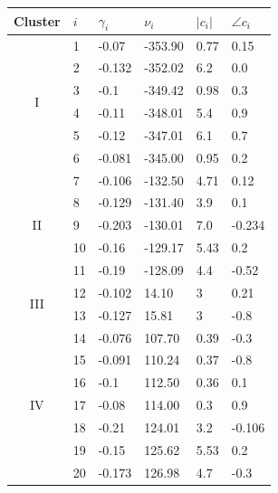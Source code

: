 \begin{table}[H]
	\centering
	\begin{tabular}{clllll}
		\multicolumn{1}{l}{Cluster} & $i$  & $\gamma_i$ & $\nu_i$      & $|c_i|$   & $\angle c_i$ \\ 
		\hline
		\multirow{6}{*}{I}            
		& 1  & -0.07      & -353.90  & 0.77   & 0.15         \\ %
		& 2  & -0.132     & -352.02  & 6.2    & 0.0          \\ %
		& 3  & -0.1       & -349.42  & 0.98   & 0.3          \\ %
		& 4  & -0.11      & -348.01  & 5.4    & 0.9          \\ %
		& 5  & -0.12      & -347.01  & 6.1    & 0.7          \\ %
		& 6  & -0.081     & -345.00  & 0.95   & 0.2          \\ 
		\hline
		\multirow{5}{*}{II}          
		& 7  & -0.106     & -132.50  & 4.71   & 0.12         \\ %
		& 8  & -0.129     & -131.40  & 3.9    & 0.1          \\ %
		& 9  & -0.203     & -130.01  & 7.0    & -0.234       \\ %
		& 10 & -0.16      & -129.17  & 5.43   & 0.2          \\ %
		& 11 & -0.19      & -128.09  & 4.4    & -0.52        \\ 
		\hline 
		\multirow{2}{*}{III}          
		& 12 & -0.102     & 14.10    & 3      & 0.21         \\ %
		& 13 & -0.127     & 15.81    & 3      & -0.8         \\ %
		\hline 
		\multirow{7}{*}{IV}           
		& 14 & -0.076     & 107.70   & 0.39   & -0.3         \\ %
		& 15 & -0.091     & 110.24   & 0.37   & -0.8         \\ %
		& 16 & -0.1       & 112.50   & 0.36   & 0.1          \\ %
		& 17 & -0.08      & 114.00   & 0.3    & 0.9          \\ %
		& 18 & -0.21      & 124.01  & 3.2    & -0.106       \\ %
		& 19 & -0.15      & 125.62  & 5.53   & 0.2          \\ %
		& 20 & -0.173     & 126.98  & 4.7    & -0.3         \\ %

\end{tabular}
\end{table}
